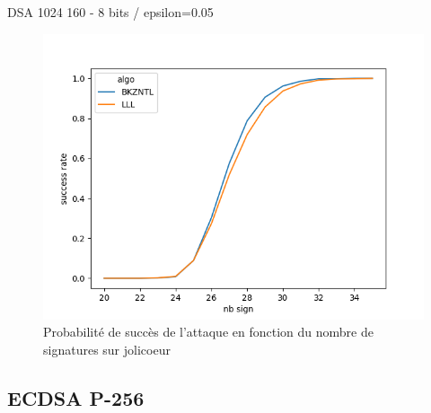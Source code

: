 \documentclass{backend/backend}
\begin{document}
\begin{frame}{DSA 1024 160 - 8 bits / epsilon=0.05}
\vspace*{-0.28cm}
\begin{figure}
    \centering
    \includegraphics[width=0.60\linewidth]{img/courbes/proba_160_005/1024_160_lineplot.png}
    \vspace*{-0.20cm}
    \caption{\footnotesize Probabilité de succès de l'attaque en fonction du nombre de signatures sur jolicoeur}
    \label{fig:proba_005_1024_160_lineplot}
\end{figure}
\end{frame}


\subsection{ECDSA P-256}
\end{document}
